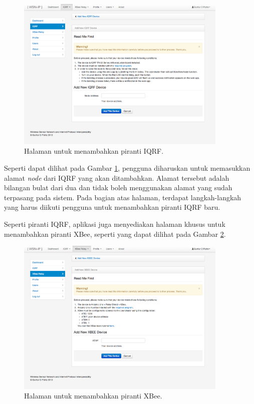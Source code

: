 				\begin{figure}[H]
				  \centering
				    \includegraphics[width=0.9\textwidth]{gambar/iqrf-add}
				    \caption{Halaman untuk menambahkan piranti IQRF.}
				    \label{iqrf-add}
				\end{figure}

			Seperti dapat dilihat pada Gambar \ref{iqrf-add}, pengguna diharuskan untuk memasukkan alamat \emph{node} dari IQRF yang akan ditambahkan. Alamat tersebut adalah bilangan bulat dari dua dan tidak boleh menggunakan alamat yang sudah terpasang pada sistem. Pada bagian atas halaman, terdapat langkah-langkah yang harus diikuti pengguna untuk menambahkan piranti IQRF baru.

			Seperti piranti IQRF, aplikasi juga menyediakan halaman khusus untuk menambahkan piranti XBee, seperti yang dapat dilihat pada Gambar \ref{xbee-add}.

				\begin{figure}[H]
				  \centering
				    \includegraphics[width=0.9\textwidth]{gambar/xbee-add}
				    \caption{Halaman untuk menambahkan piranti XBee.}
				    \label{xbee-add}
				\end{figure}

